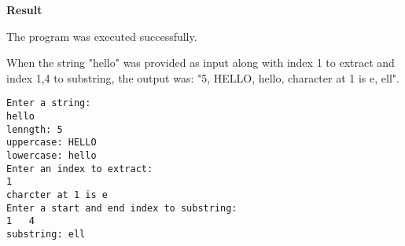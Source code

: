 \vspace{0.5cm}
\textbf{Result}
\vspace{0.5cm}

The program was executed successfully. 

When the string "hello" was provided as input along with index 1 to extract and index 1,4 to substring, the output was: "5, HELLO, hello, character at 1 is e, ell".
\begin{verbatim}
Enter a string: 
hello
lenngth: 5
uppercase: HELLO
lowercase: hello
Enter an index to extract: 
1
charcter at 1 is e
Enter a start and end index to substring: 
1	4
substring: ell
\end{verbatim}


